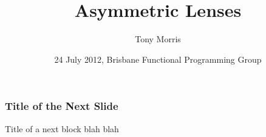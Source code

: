 \documentclass{beamer}
\begin{document}
\title{\large Asymmetric Lenses}

\author{
  {\small Tony Morris\\}
}
\date{{\footnotesize 24 July 2012, Brisbane Functional Programming Group}}

\begin{frame}
  \titlepage
\end{frame}



\begin{frame}
\frametitle{Title of the Next Slide}
\begin{block}{Title of a next block}
  blah blah
\end{block}
\end{frame}
\end{document}
